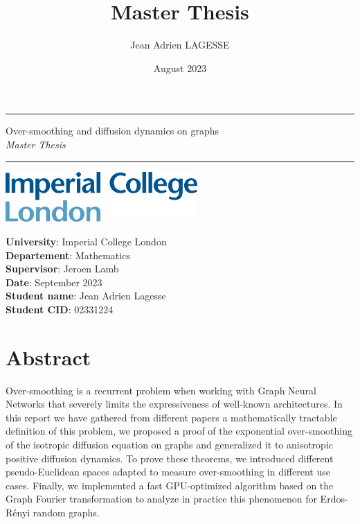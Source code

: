 \documentclass[12pt]{article}
\title{Master Thesis}
\author{Jean Adrien LAGESSE}
\date{August 2023}
\begin{document}
\begin{titlepage}
   \begin{center}       
        \rule{1.1\textwidth}{1pt}
        \vspace{0.7cm}
        {\huge
        Over-smoothing and diffusion dynamics on graphs\\
        }
        \vspace{0.8cm}
        \textit{Master Thesis}
        \vspace{0.7cm}
        \rule{1.1\textwidth}{1pt}


       \vfill
            
        \begin{center}
            \includegraphics[width=0.55\textwidth]{images/logo.png}
        \end{center}
       
       \vspace{3cm}
   \end{center}
   
   \textbf{University}: Imperial College London\\
    \textbf{Departement}: Mathematics\\
    \textbf{Supervisor}: Jeroen Lamb\\
    \textbf{Date}: September 2023\\
    \textbf{Student name}: Jean Adrien Lagesse\\
    \textbf{Student CID}: 02331224
\end{titlepage}

\newpage
\vspace{4cm}
\section*{\centering Abstract}
\vspace{1.5cm}
Over-smoothing is a recurrent problem when working with Graph Neural Networks that severely limits the expressiveness of well-known architectures. In this report we have gathered from different papers a mathematically tractable definition of this problem, we proposed a proof of the exponential over-smoothing of the isotropic diffusion equation on graphs and generalized it to anisotropic positive diffusion dynamics. To prove these theorems, we introduced different pseudo-Euclidean spaces adapted to measure over-smoothing in different use cases. Finally, we implemented a fast GPU-optimized algorithm based on the Graph Fourier transformation to analyze in practice this phenomenon for Erdos-Rényi random graphs.
\end{document}
